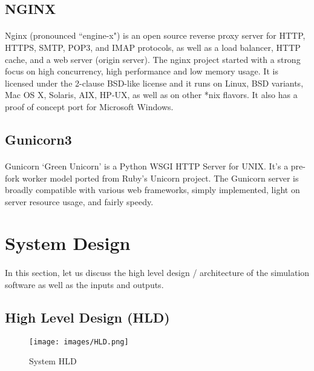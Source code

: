 \documentclass[12pt, a4paper]{extarticle}
\begin{document}
        \subsection{NGINX} 
            \paragraph{} Nginx (pronounced ``engine-x") is an open source reverse proxy server for HTTP, HTTPS, SMTP, POP3, and IMAP protocols, as well as a load balancer, HTTP cache, and a web server (origin server). The nginx project started with a strong focus on high concurrency, high performance and low memory usage. It is licensed under the 2-clause BSD-like license and it runs on Linux, BSD variants, Mac OS X, Solaris, AIX, HP-UX, as well as on other *nix flavors. It also has a proof of concept port for Microsoft Windows.
        \subsection{Gunicorn3}
            \paragraph{} Gunicorn ‘Green Unicorn’ is a Python WSGI HTTP Server for UNIX. It’s a pre-fork worker model ported from Ruby’s Unicorn project. The Gunicorn server is broadly compatible with various web frameworks, simply implemented, light on server resource usage, and fairly speedy.

    \newpage
    \section{System Design}
        \paragraph{} In this section, let us discuss the high level design / architecture of the simulation software as well as the inputs and outputs.
        \subsection{High Level Design (HLD)}
            \begin{figure}[h]
                \texttt{[image: images/HLD.png]}
                \caption{System HLD}
            \end{figure}
\end{document}
